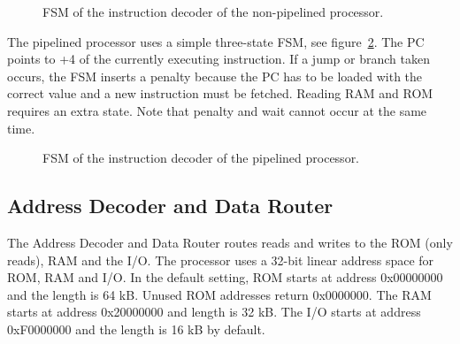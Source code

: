 \documentclass[12pt]{article}
\begin{document}
\begin{figure}[!ht]
\centering
{}
\caption{FSM of the instruction decoder of the non-pipelined processor.}
\label{fsmnonpipe}
\end{figure}

The pipelined processor uses a simple three-state FSM, see figure~\ref{fsmpipe}. The PC points to +4 of the currently executing instruction. If a jump or branch taken occurs, the FSM inserts a penalty because the PC has to be loaded with the correct value and a new instruction must be fetched. Reading RAM and ROM requires an extra state. Note that penalty and wait cannot occur at the same time.

\begin{figure}[!ht]
\centering
{}
\caption{FSM of the instruction decoder of the pipelined processor.}
\label{fsmpipe}
\end{figure}

\subsection{Address Decoder and Data Router}
\label{sec:addressdecoderanddatarouter}
The Address Decoder and Data Router routes reads and writes to the ROM (only reads), RAM and the I/O. The processor uses a 32-bit linear address space for ROM, RAM and I/O. In the default setting, ROM starts at address 0x00000000 and the length is 64 kB. Unused ROM addresses return 0x0000000. The RAM starts at address 0x20000000 and length is 32 kB. The I/O starts at address 0xF0000000 and the length is 16 kB by default.
\end{document}
